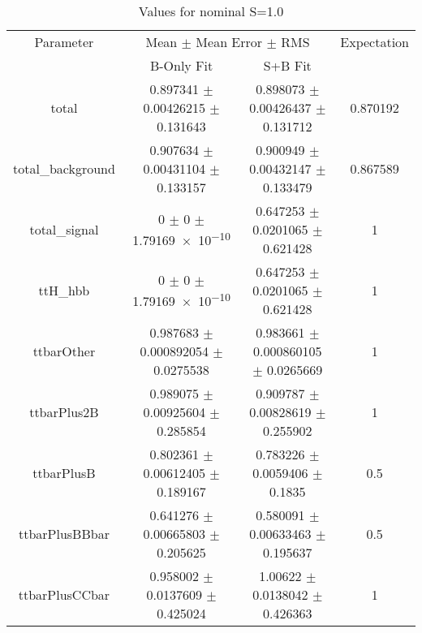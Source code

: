 \begin{table}
\centering
\caption{Values for nominal S=1.0}
\begin{tabular}{cccc}
\toprule
Parameter & \multicolumn{2}{c}{Mean $\pm$ Mean Error $\pm$ RMS} & Expectation\\
 & B-Only Fit & S+B Fit & \\
\midrule
total & \num{0.897341} $\pm$ \num{0.00426215} $\pm$ \num{0.131643} & \num{0.898073} $\pm$ \num{0.00426437} $\pm$ \num{0.131712} & \num{0.870192}\\
total\_background & \num{0.907634} $\pm$ \num{0.00431104} $\pm$ \num{0.133157} & \num{0.900949} $\pm$ \num{0.00432147} $\pm$ \num{0.133479} & \num{0.867589}\\
total\_signal & \num{0} $\pm$ \num{0} $\pm$ \num{1.79169e-10} & \num{0.647253} $\pm$ \num{0.0201065} $\pm$ \num{0.621428} & \num{1}\\
ttH\_hbb & \num{0} $\pm$ \num{0} $\pm$ \num{1.79169e-10} & \num{0.647253} $\pm$ \num{0.0201065} $\pm$ \num{0.621428} & \num{1}\\
ttbarOther & \num{0.987683} $\pm$ \num{0.000892054} $\pm$ \num{0.0275538} & \num{0.983661} $\pm$ \num{0.000860105} $\pm$ \num{0.0265669} & \num{1}\\
ttbarPlus2B & \num{0.989075} $\pm$ \num{0.00925604} $\pm$ \num{0.285854} & \num{0.909787} $\pm$ \num{0.00828619} $\pm$ \num{0.255902} & \num{1}\\
ttbarPlusB & \num{0.802361} $\pm$ \num{0.00612405} $\pm$ \num{0.189167} & \num{0.783226} $\pm$ \num{0.0059406} $\pm$ \num{0.1835} & \num{0.5}\\
ttbarPlusBBbar & \num{0.641276} $\pm$ \num{0.00665803} $\pm$ \num{0.205625} & \num{0.580091} $\pm$ \num{0.00633463} $\pm$ \num{0.195637} & \num{0.5}\\
ttbarPlusCCbar & \num{0.958002} $\pm$ \num{0.0137609} $\pm$ \num{0.425024} & \num{1.00622} $\pm$ \num{0.0138042} $\pm$ \num{0.426363} & \num{1}\\
\bottomrule
\end{tabular}
\end{table}